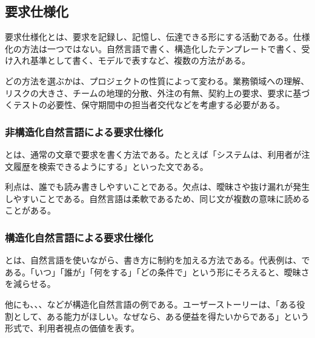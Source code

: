 \subsection{要求仕様化}

要求仕様化とは、要求を記録し、記憶し、伝達できる形にする活動である。仕様化の方法は一つではない。自然言語で書く、構造化したテンプレートで書く、受け入れ基準として書く、モデルで表すなど、複数の方法がある。

どの方法を選ぶかは、プロジェクトの性質によって変わる。業務領域への理解、リスクの大きさ、チームの地理的分散、外注の有無、契約上の要求、要求に基づくテストの必要性、保守期間中の担当者交代などを考慮する必要がある。


\subsubsection{非構造化自然言語による要求仕様化}

とは、通常の文章で要求を書く方法である。たとえば「システムは、利用者が注文履歴を検索できるようにする」といった文である。

利点は、誰でも読み書きしやすいことである。欠点は、曖昧さや抜け漏れが発生しやすいことである。自然言語は柔軟であるため、同じ文が複数の意味に読めることがある。

\subsubsection{構造化自然言語による要求仕様化}

とは、自然言語を使いながら、書き方に制約を加える方法である。代表例は、である。「いつ」「誰が」「何をする」「どの条件で」という形にそろえると、曖昧さを減らせる。


他にも、、、などが構造化自然言語の例である。ユーザーストーリーは、「ある役割として、ある能力がほしい。なぜなら、ある便益を得たいからである」という形式で、利用者視点の価値を表す。

